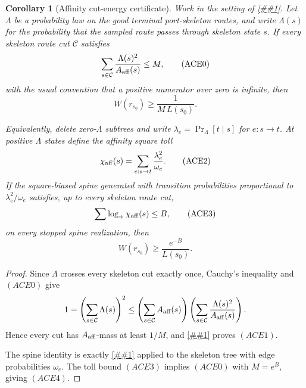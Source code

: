 \documentclass[10pt]{article}
\newcommand{\cref}[1]{\ref{##1}}
\newtheorem{corollary}[theorem]{Corollary}
\theoremstyle{definition}
\begin{document}
\begin{corollary}[Affinity cut-energy certificate]
   \label{cor:affinity-cut-energy}
   Work in the setting of \cref{cor:affinity-cut-posterior-handoff}.  Let
   \(\Lambda\) be a probability law on the good terminal port-skeleton routes,
   and write \(\Lambda(s)\) for the probability that the sampled route passes
   through skeleton state \(s\).  If every skeleton route cut \(\mathcal C\)
   satisfies
   \[
      \sum_{s\in\mathcal C}
      \frac{\Lambda(s)^2}{A_{\rm aff}(s)}
      \le M ,
      \tag{ACE0}
   \]
   with the usual convention that a positive numerator over zero is infinite,
   then
   \[
      W(r_{s_0})\ge\frac{1}{M\,L(s_0)}.
      \tag{ACE1}
   \]

   Equivalently, delete zero-\(\Lambda\) subtrees and write
   \(\lambda_e=\Pr_\Lambda[t\mid s]\) for \(e:s\to t\).  At positive
   \(\Lambda\) states define the affinity square toll
   \[
      \chi_{\rm aff}(s)
      =
      \sum_{e:s\to t}\frac{\lambda_e^2}{\omega_e}.
      \tag{ACE2}
   \]
   If the square-biased spine generated with transition probabilities
   proportional to \(\lambda_e^2/\omega_e\) satisfies, up to every skeleton
   route cut,
   \[
      \sum\log_+\chi_{\rm aff}(s)\le B ,
      \tag{ACE3}
   \]
   on every stopped spine realization, then
   \[
      W(r_{s_0})\ge \frac{e^{-B}}{L(s_0)} .
      \tag{ACE4}
   \]
\end{corollary}

\begin{proof}
   Since \(\Lambda\) crosses every skeleton cut exactly once,
   Cauchy's inequality and \((ACE0)\) give
   \[
      1
      =
      \left(\sum_{s\in\mathcal C}\Lambda(s)\right)^2
      \le
      \left(\sum_{s\in\mathcal C}A_{\rm aff}(s)\right)
      \left(\sum_{s\in\mathcal C}
      \frac{\Lambda(s)^2}{A_{\rm aff}(s)}\right).
   \]
   Hence every cut has \(A_{\rm aff}\)-mass at least \(1/M\), and
   \cref{cor:affinity-cut-posterior-handoff} proves \((ACE1)\).

   The spine identity is exactly \cref{lem:frontier-square-toll} applied to
   the skeleton tree with edge probabilities \(\omega_e\).  The toll bound
   \((ACE3)\) implies \((ACE0)\) with \(M=e^B\), giving \((ACE4)\).
\end{proof}
\end{document}
